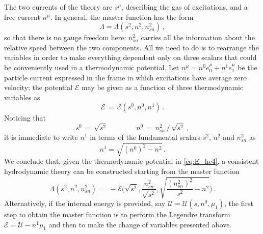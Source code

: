 \documentclass[usenatbib]{mnras}
\begin{document}
The two currents of the theory are  $s^\mu$, describing the gas of excitations, and a free current $n^\mu$. In general,  the master function has the form
%
\begin{equation}
\Lambda = \Lambda (s^2,n^2,n_{sn}^2) \, ,
\end{equation}
%
so that there is no gauge freedom here: $n_{sn}^2$ carries all the information about the relative speed between the two components. All we need to do is to rearrange the variables in order to make everything dependent only on three scalars that could be conveniently used in a thermodynamic potential. 
%
Let $n^\mu = n^0 e^\mu_0+n^1 e^\mu_1$ be the particle current  expressed in the frame in which excitations have average zero velocity; the potential $\mathcal{E}$ may be given as a function of three thermodynamic variables as 
%
\begin{equation}
\label{eq:E_he4}
\mathcal{E} \, = \, \mathcal{E}(s^0,n^0,n^1) \, .
\end{equation} 
%
Noticing that 
%
\begin{equation}
s^0\,  = \, \sqrt{s^2}  
\qquad \qquad
n^0 \, = \, n_{sn}^2 \, / \, \sqrt{s^2} \,  ,
\end{equation} 
%
it is immediate to write $n^1$ in terms of the fundamental scalars $s^2$, $n^2$ and $n_{sn}^2$ as
%
\begin{equation}
n^1 = \sqrt{(n^0)^2 - n^2} \, .
\end{equation}
%
We conclude that, given the thermodynamic potential in \eqref{eq:E_he4}, a consistent hydrodynamic theory can be constructed starting from the master function
%
\begin{equation}
\Lambda (s^2,n^2,n_{sn}^2) 
\, = \,  
-\mathcal{E}\bigg(\sqrt{s^2},\dfrac{n_{sn}^2}{\sqrt{s^2}}, \sqrt{\dfrac{(n_{sn}^2)^2}{s^2} - n^2} \bigg) \, .
\end{equation}
%
Alternatively, if the internal energy is provided, say $\mathcal{U}= \mathcal{U}(s,n^0,\mu_1)$, the first step to obtain the master function is to perform the Legendre transform $\mathcal{E}=\mathcal{U}-n^1 \mu_1$ and then to make the change of variables presented above.
\end{document}
